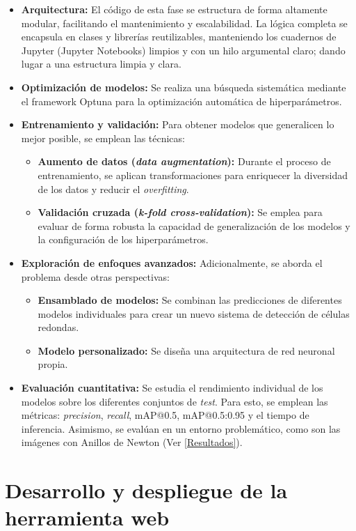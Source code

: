 \documentclass[12pt,a4paper,onecolumn,oneside]{report}
\begin{document}
\begin{itemize}
  \item \textbf{Arquitectura:} El código de esta fase se estructura de forma altamente modular, facilitando el mantenimiento y escalabilidad. La lógica completa se encapsula en clases y librerías reutilizables, manteniendo los cuadernos de Jupyter 
  (Jupyter Notebooks) limpios y con un hilo argumental claro; dando lugar a una estructura limpia y clara.
  \item \textbf{Optimización de modelos:} Se realiza una búsqueda sistemática mediante el framework Optuna \cite{optuna_github} para la optimización automática de hiperparámetros.
  \item \textbf{Entrenamiento y validación:} Para obtener modelos que generalicen lo mejor posible, se emplean las técnicas:
  \begin{itemize}
    \item \textbf{Aumento de datos (\textit{data augmentation}):} Durante el proceso de entrenamiento, se aplican transformaciones para enriquecer la diversidad de los datos y reducir el \textit{overfitting}.
    \item \textbf{Validación cruzada (\textit{k-fold cross-validation}):} Se emplea para evaluar de forma robusta la capacidad de generalización de los modelos y la configuración de los hiperparámetros.
  \end{itemize} 
  \item \textbf{Exploración de enfoques avanzados:} Adicionalmente, se aborda el problema desde otras perspectivas:
  \begin{itemize}
    \item \textbf{Ensamblado de modelos:} Se combinan las predicciones de diferentes modelos individuales para crear un nuevo sistema de detección de células redondas. 
    \item \textbf{Modelo personalizado:} Se diseña una arquitectura de red neuronal propia.
  \end{itemize}
  \item \textbf{Evaluación cuantitativa:} Se estudia el rendimiento individual de los modelos sobre los diferentes conjuntos de \textit{test}. Para esto, se emplean las métricas: 
  \textit{precision}, \textit{recall}, mAP@0.5, mAP@0.5:0.95 y el tiempo de inferencia. Asimismo, se evalúan en un entorno problemático, como son las imágenes con Anillos de Newton (Ver \autoref{Resultados}).
\end{itemize}

\section{Desarrollo y despliegue de la herramienta web}
\label{Despliegue de la herramienta web}
\end{document}
